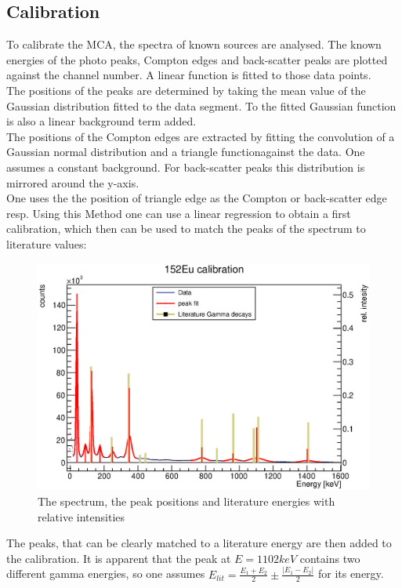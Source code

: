 \documentclass{article}
\begin{document}
\subsection{Calibration}
To calibrate the MCA, the spectra of known sources are analysed.
The known energies of the photo peaks, Compton edges and back-scatter peaks are plotted against the channel number.
A linear function is fitted to those data points.\\
The positions of the peaks are determined by taking the mean value of the Gaussian distribution fitted to the data segment. To the fitted Gaussian function is also a linear background term added.\\
The positions of the Compton edges are extracted by fitting the convolution of a Gaussian normal distribution and a triangle function\footnotemark against the data. One assumes a constant background.
For back-scatter peaks this distribution is mirrored around the y-axis.\\
One uses the the position of triangle edge as the Compton or back-scatter edge resp.
Using this Method one can use a linear regression to obtain a first calibration, which then can be used to match the peaks of the  spectrum to literature values:
\begin{figure}[H]
    \centering
    \includegraphics[width=\textwidth]{Graphen/eu/eu.eps}
    \caption{The  spectrum, the peak positions and literature energies with relative intensities }
    \label{eu_match}
\end{figure}
The peaks, that can be clearly matched to a literature energy are then added to the calibration. It is apparent that the peak at $E=1102 keV$ contains two different gamma energies, so one assumes $E_{lit}=\frac{E_1+E_2}{2} \pm \frac{|E_1-E_2|}{2}$ for its energy.
\end{document}
